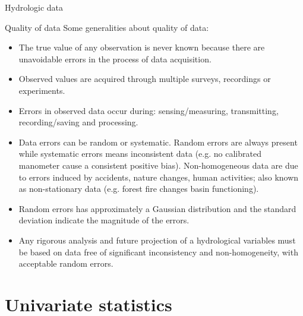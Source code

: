 \documentclass[8pt]{beamer}
\begin{document}
\begin{frame}{Hydrologic data}
    \begin{block}{Quality of data}
        Some generalities about quality of data:
        \begin{itemize}
            \item The \alert{true value} of any observation is never known because there are unavoidable errors in the process of data acquisition.
            \item \alert{Observed values} are acquired through multiple surveys, recordings or experiments.
            \item Errors in observed data occur during: \alert{sensing/measuring}, \alert{transmitting}, \alert{recording/saving} and \alert{processing}. 
            \item Data errors can be \alert{random} or \alert{systematic}. Random errors are always present while systematic errors means \alert{inconsistent data} (e.g. no calibrated manometer cause a consistent positive bias). \alert{Non-homogeneous data} are due to errors induced by accidents, nature changes, human activities; also known as non-stationary data (e.g. forest fire changes basin functioning). 
            \item Random errors has approximately a \alert{Gaussian distribution} and the \alert{standard deviation} indicate the magnitude of the errors.
            \item Any rigorous analysis and future projection of a hydrological variables must be based on data free of significant inconsistency and non-homogeneity, with acceptable random errors. 
        \end{itemize}
    \end{block}
\end{frame}

\section{Univariate statistics}
\end{document}
